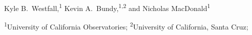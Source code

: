 Kyle B.\ Westfall,\textsuperscript{1}
Kevin A.\ Bundy,\textsuperscript{1,2}
and
Nicholas MacDonald\textsuperscript{1}

\begin{small}
\textsuperscript{1}University of California Observatories;
\textsuperscript{2}University of California, Santa Cruz;
\end{small}


